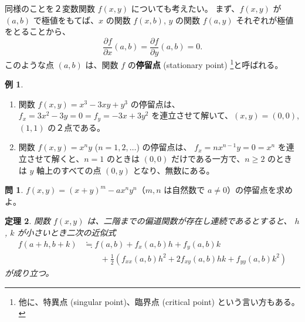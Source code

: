 \documentclass[a4paper]{jsarticle}
\newtheorem{Theorem}{定理}[section]
\theoremstyle{definition}
\newtheorem{Example}[Theorem]{例}
\newtheorem{Exercise}{問}%
\theoremstyle{remark}
\newcommand{\del}{\partial}
\begin{document}
同様のことを２変数関数 $f(x,y)$ についても考えたい。
まず、$f(x,y)$ が $(a,b)$ で極値をもてば、$x$ の関数 $f(x,b)$, $y$ の関数
 $f(a,y)$ それぞれが極値をとることから、
\[
\frac{\del f}{\del x}(a,b) = \frac{\del f}{\del y}(a,b) = 0.
\]
このような点 $(a,b)$ は、関数 $f$ の{\bf 停留点} (stationary point)
\footnote{他に、特異点 (singular point)、臨界点 (critical point) という言い方もある。}と呼ばれる。

\begin{Example}~
  \begin{enumerate}
    \item
  関数 $f(x,y) = x^3 -3xy + y^3$ の停留点は、
  $f_x = 3x^2 - 3y = 0 = f_y = -3x + 3y^2$ を連立させて解いて、$(x,y) = (0,0)$, $(1,1)$ の２点である。
\item
  関数 $f(x,y) = x^ny$ ($n=1,2,\dots$) の停留点は、
  $f_x = nx^{n-1}y = 0 = x^n$ を連立させて解くと、$n=1$ のときは $(0,0)$ だけである一方で、$n \geq 2$ のときは $y$ 軸上のすべての点 $(0,y)$
  となり、無数にある。
\end{enumerate}
\end{Example}

\begin{Exercise}
$f(x,y) = (x+y)^m - ax^ny^n$（$m,n$ は自然数で $a \not= 0$）の停留点を求めよ。
\end{Exercise}

\begin{Theorem}
関数 $f(x,y)$ は、二階までの偏道関数が存在し連続であるとすると、
$h$, $k$ が小さいとき二次の近似式
\begin{align*}
f(a+h,b+k) &\fallingdotseq f(a,b) + f_x(a,b)h + f_y(a,b)k\\
&\qquad + \frac{1}{2}(f_{xx}(a,b)h^2 + 2f_{xy}(a,b)hk + f_{yy}(a,b)k^2)
\end{align*}
が成り立つ。
\end{Theorem}
\end{document}
